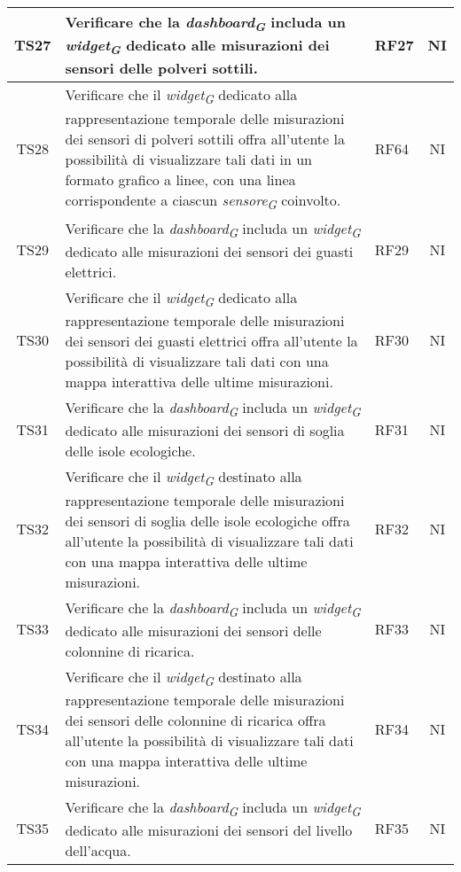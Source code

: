\begin{longtable}{|c|p{5cm}|>{\raggedright}p{2cm}|c|}
        \hline
        TS27 & Verificare che la \textit{dashboard}\textsubscript{\textit{G}} includa un \textit{widget}\textsubscript{\textit{G}} dedicato alle misurazioni dei sensori delle polveri sottili. & RF27 & NI \\
        \hline
        TS28 & Verificare che il \textit{widget}\textsubscript{\textit{G}} dedicato alla rappresentazione temporale delle misurazioni dei sensori di polveri sottili offra all'utente la possibilità di visualizzare tali dati in un formato grafico a linee, con una linea corrispondente a ciascun \textit{sensore}\textsubscript{\textit{G}} coinvolto. & RF64 & NI \\
        \hline
        TS29 & Verificare che la \textit{dashboard}\textsubscript{\textit{G}} includa un \textit{widget}\textsubscript{\textit{G}} dedicato alle misurazioni dei sensori dei guasti elettrici. & RF29 & NI \\
        \hline
        TS30 & Verificare che il \textit{widget}\textsubscript{\textit{G}} dedicato alla rappresentazione temporale delle misurazioni dei sensori dei guasti elettrici offra all'utente la possibilità di visualizzare tali dati con una mappa interattiva delle ultime misurazioni. & RF30 & NI \\
        \hline
        TS31 & Verificare che la \textit{dashboard}\textsubscript{\textit{G}} includa un \textit{widget}\textsubscript{\textit{G}} dedicato alle misurazioni dei sensori di soglia delle isole ecologiche. & RF31 & NI \\
        \hline
        TS32 & Verificare che il \textit{widget}\textsubscript{\textit{G}} destinato alla rappresentazione temporale delle misurazioni dei sensori di soglia delle isole ecologiche offra all'utente la possibilità di visualizzare tali dati con una mappa interattiva delle ultime misurazioni. & RF32 & NI \\
        \hline
        TS33 & Verificare che la \textit{dashboard}\textsubscript{\textit{G}} includa un \textit{widget}\textsubscript{\textit{G}} dedicato alle misurazioni dei sensori delle colonnine di ricarica. & RF33 & NI \\
        \hline
        TS34 & Verificare che il \textit{widget}\textsubscript{\textit{G}} destinato alla rappresentazione temporale delle misurazioni dei sensori delle colonnine di ricarica offra all'utente la possibilità di visualizzare tali dati con una mappa interattiva delle ultime misurazioni. & RF34 & NI \\
        \hline
        TS35 & Verificare che la \textit{dashboard}\textsubscript{\textit{G}} includa un \textit{widget}\textsubscript{\textit{G}} dedicato alle misurazioni dei sensori del livello dell'acqua. & RF35 & NI \\

\end{longtable}
